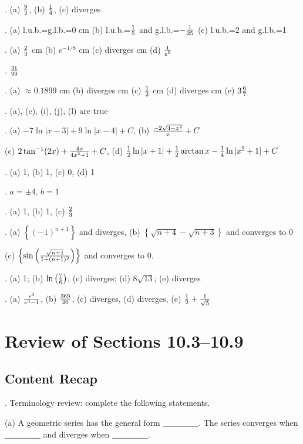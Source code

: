 \documentclass[12pt]{article}
\begin{document}
. (a) ${{9}\over{2}}$, (b) ${{1}\over{4}}$, (c) diverges

.  (a) l.u.b.=g.l.b.=0  cm (b) l.u.b.=${{1}\over{5}}$ and 
g.l.b.=$-{{1}\over{25}}$ \hfil\break
(c) l.u.b.=2 and g.l.b.=1

.  (a) ${{2}\over{3}}$  cm (b) $e^{-1/8}$  cm 
(c) diverges  cm (d) ${{1}\over{e^5}}$

.  ${{31}\over{99}}$

.  (a) $\approx 0.1899$  cm (b) diverges  cm
(c) ${{1}\over{2}}$  cm
(d) diverges  cm (e) $3 {{6}\over{7}}$

.  (a), (c), (i), (j), (l) are true

. (a) $-7 \ln|x-3|+9\ln |x-4|+C$,  (b) ${{-2\sqrt{4-x^2}}\over{x}}+ 
C$ 

\noindent (c) $2 \tan ^{-1}(2x)+{{4x}\over{4x^2+1}}+C$, (d) 
${{1}\over{2}}\ln|x+1|+{{1}\over{2}}\arctan x-{{1}\over{4}}\ln|x^2+1|+C$

. (a) 1, (b) 1, (c) 0, (d) 1

.  $a = \pm 4$, $b=1$

.  (a) 1, (b) 1, (c) ${{2}\over{3}}$

.  (a) $\left\{ (-1)^{n+1} \right\} $ and diverges, (b) 
$\left\{ \sqrt{n+4}-\sqrt{n+3} \right\}$ and converges to $0$

\noindent (c) $\left\{ \sin\left({{\sqrt{n+1}}\over{1+(n+1)^2}}\right) 
\right\}$ and converges to $0$. 

.  (a) 1; (b) $\ln \left ( {{7}\over{6}} \right )$; (c) 
diverges; (d) $8\sqrt{13}$; (e) diverges

. (a) ${{e^3}\over{e^3-1}}$, (b) ${{369}\over{20}}$, (c) diverges, (d) 
diverges, (e) ${{1}\over{2}} + {{1}\over{\sqrt{5}}}$

\section{Review of Sections 10.3--10.9}

\subsection*{Content Recap}

.  Terminology review: complete the following statements.

\noindent (a) A geometric series has the general form 
$\_\_\_\_\_\_\_\_\_\_\_\_\_$.  \hfil\break
The series converges when 
$\_\_\_\_\_\_\_\_\_\_\_\_\_$ and diverges when 
$\_\_\_\_\_\_\_\_\_\_\_\_\_$.
\end{document}
